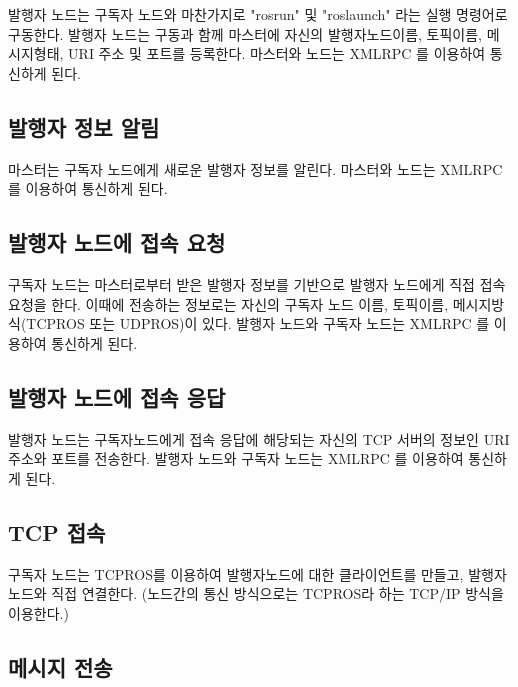 발행자 노드는 구독자 노드와 마찬가지로 "rosrun" 및 "roslaunch" 라는 실행 명령어로 구동한다. 발행자 노드는 구동과 함께 마스터에 자신의 발행자노드이름, 토픽이름, 메시지형태, URI 주소 및 포트를 등록한다. 마스터와 노드는 XMLRPC 를 이용하여 통신하게 된다.

\subsection{발행자 정보 알림}

마스터는 구독자 노드에게 새로운 발행자 정보를 알린다. 마스터와 노드는 XMLRPC 를 이용하여 통신하게 된다.

\subsection{발행자 노드에 접속 요청}

구독자 노드는 마스터로부터 받은 발행자 정보를 기반으로 발행자 노드에게 직접 접속 요청을 한다. 이때에 전송하는 정보로는 자신의 구독자 노드 이름, 토픽이름, 메시지방식(TCPROS 또는 UDPROS)이 있다. 발행자 노드와 구독자 노드는 XMLRPC 를 이용하여 통신하게 된다.

\subsection{발행자 노드에 접속 응답}

발행자 노드는 구독자노드에게 접속 응답에 해당되는 자신의 TCP 서버의 정보인 URI주소와 포트를 전송한다. 발행자 노드와 구독자 노드는 XMLRPC 를 이용하여 통신하게 된다.

\subsection{TCP 접속}

구독자 노드는 TCPROS를 이용하여 발행자노드에 대한 클라이언트를 만들고, 발행자노드와 직접 연결한다. (노드간의 통신 방식으로는 TCPROS라 하는 TCP/IP 방식을 이용한다.)

\subsection{메시지 전송}

